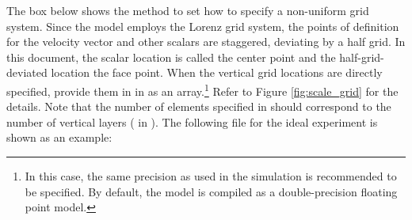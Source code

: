 The box below shows the method to set how to specify a non-uniform grid system.
Since the model employs the Lorenz grid system, the points of definition for the velocity vector and other scalars are staggered, deviating by a half grid.
In this document, the scalar location is called the center point and the half-grid-deviated location the face point.
When the vertical grid locations are directly specified, provide them in  in  as an array.\footnote{In this case, the same precision as used in the simulation is recommended to be specified. By default, the model is compiled as a double-precision floating point model.} Refer to Figure \ref{fig:scale_grid} for the details. Note that the number of elements specified in  should correspond to the number of vertical layers ( in ). The following file for the ideal experiment is shown as an example: 

